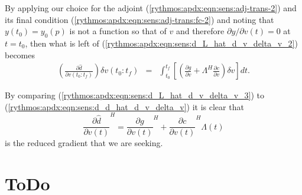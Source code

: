 \documentclass[pdf,ps2pdf,11pt]{SANDreport}
\begin{document}
%
By applying our choice for the adjoint
(\ref{rythmos:apdx:eqn:sens:adj-trans-2}) and its final condition
(\ref{rythmos:apdx:eqn:sens:adj-trans:fc-2}) and noting that $y(t_0) =
y_0(p)$ is not a function so that of $v$ and therefore $\partial y /
{}\partial v(t) = 0$ at $t=t_0$, then what is left of
(\ref{rythmos:apdx:eqn:sens:d_L_hat_d_v_delta_v_2}) becomes
%
\begin{eqnarray}
\left( \frac{\partial \hat{d}}{\partial v(t_0:t_f)} \right) \delta v(t_0:t_f)
& = & \int_{t_0}^{t_f} \left[ \left(
    \frac{\partial g}{\partial v}
    + \Lambda^H \frac{\partial c}{\partial v}
  \right) \delta v \right] dt
\label{rythmos:apdx:eqn:sens:d_L_hat_d_v_delta_v_3}.
\end{eqnarray}

By comparing (\ref{rythmos:apdx:eqn:sens:d_L_hat_d_v_delta_v_3}) to
(\ref{rythmos:apdx:eqn:sens:d_d_hat_d_v_delta_v}) it is clear that
%
\begin{equation}
\frac{\partial \hat{d}}{\partial v(t)}^H
= \frac{\partial g}{\partial v(t)}^H + \frac{\partial c}{\partial v(t)}^H \Lambda(t)
\label{rythmos:apdx:eqn:sens:d_d_hat_d_v_t}
\end{equation}
%
is the reduced gradient that we are seeking.

\section{ToDo}
\end{document}

